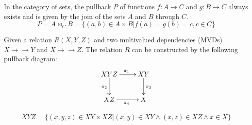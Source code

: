 




In the category of sets, the pullback $P$ of functions $f : A \to C$ and $g : B \to C$ always exists and is given by the join of the sets $A$ and $B$ through $C$.
\[ P = A \bowtie_C B = \{ (a,b) \in A \times B | f(a)=g(b)=c, c \in C \} \]



Given a relation $R(X,Y,Z)$ and two multivalued dependencies (MVDs) $ X \to\to Y$ and  $ X \to\to Z$.   The relation $R$ can be constructed by the following pullback diagram:
\[
\xymatrix{
{XYZ} \ar[r]^{\pi_1} \ar[d]_{\pi_2} & XY \ar[d]^{\pi_3} \\
XZ \ar[r]_{\pi_4} & X
}
\]


\[ XYZ = \{ (x,y,z) \in XY \times XZ |  (x,y) \in XY \wedge (x,z) \in XZ \wedge x \in X \} \]




